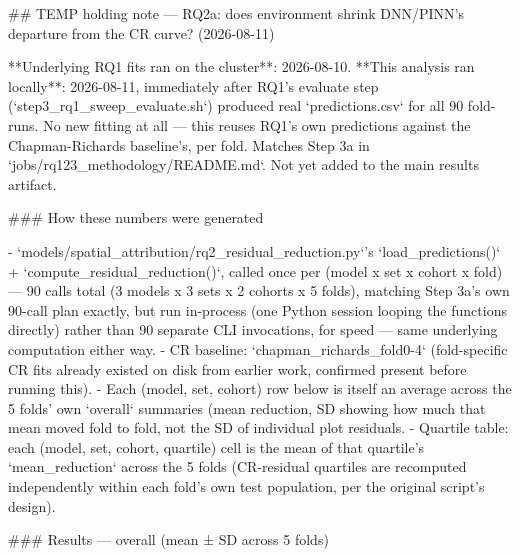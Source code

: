 ## TEMP holding note — RQ2a: does environment shrink DNN/PINN's departure from the CR curve? (2026-08-11)

**Underlying RQ1 fits ran on the cluster**: 2026-08-10. **This analysis ran locally**: 2026-08-11,
immediately after RQ1's evaluate step (`step3_rq1_sweep_evaluate.sh`) produced real
`predictions.csv` for all 90 fold-runs. No new fitting at all — this reuses RQ1's own predictions
against the Chapman-Richards baseline's, per fold. Matches Step 3a in
`jobs/rq123_methodology/README.md`. Not yet added to the main results artifact.

### How these numbers were generated

- `models/spatial_attribution/rq2_residual_reduction.py`'s `load_predictions()` +
  `compute_residual_reduction()`, called once per (model x set x cohort x fold) — 90 calls total
  (3 models x 3 sets x 2 cohorts x 5 folds), matching Step 3a's own 90-call plan exactly, but run
  in-process (one Python session looping the functions directly) rather than 90 separate CLI
  invocations, for speed — same underlying computation either way.
- CR baseline: `chapman_richards_fold{0-4}` (fold-specific CR fits already existed on disk from
  earlier work, confirmed present before running this).
- Each (model, set, cohort) row below is itself an average across the 5 folds' own `overall`
  summaries (mean reduction, %
  SD showing how much that mean moved fold to fold, not the SD of individual plot residuals.
- Quartile table: each (model, set, cohort, quartile) cell is the mean of that quartile's
  `mean_reduction` across the 5 folds (CR-residual quartiles are recomputed independently within
  each fold's own test population, per the original script's design).

### Results — overall (mean ± SD across 5 folds)

